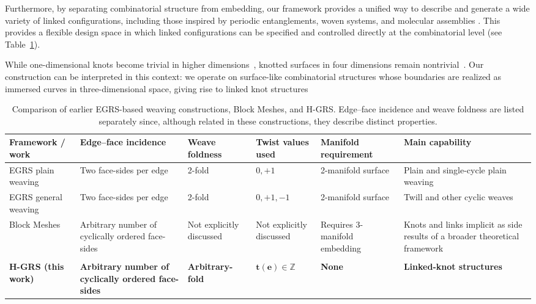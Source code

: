 \documentclass[acmtog]{acmart}
\begin{document}
Furthermore, by separating combinatorial structure from embedding, our framework provides a unified way to describe and generate a wide variety of linked configurations, including those inspired by periodic entanglements, woven systems, and molecular assemblies \citep{evans2013periodiceentanglement1,evans2013periodiceentanglement2,yildiz2025woven,yildiz2025linked}. 
This provides a flexible design space in which linked
configurations can be specified and controlled directly at the combinatorial
level (see Table~\ref{table1}).

While one-dimensional knots become trivial in higher dimensions~\cite{freedman1990topology}, knotted surfaces in four dimensions remain nontrivial~\cite{kamada2002surfaces}. Our construction can be interpreted in this context: we operate on surface-like combinatorial structures whose boundaries are realized as immersed curves in three-dimensional space, giving rise to linked knot structures

\begin{table}[t]
\centering

\caption{ Comparison of earlier EGRS-based weaving constructions, Block Meshes, and H-GRS. Edge--face incidence and weave foldness are listed separately since, although related in these constructions, they describe distinct properties.}
\label{tab:egrs-hgrs-comparison}
\small
\setlength{\tabcolsep}{4pt}
\begin{tabularx}{\textwidth}{@{}p{}p{}p{}p{}p{}X@{}}
\toprule
\textbf{Framework / work} &
\textbf{Edge--face incidence} &
\textbf{Weave foldness} &
\textbf{Twist values used} &
\textbf{Manifold requirement} &
\textbf{Main capability} \\
\midrule
EGRS plain weaving~\cite{akleman2009cyclic,xing2010single} &
Two face-sides per edge &
2-fold &
$0,+1$ &
2-manifold surface &
Plain and single-cycle plain weaving \\

EGRS general weaving~\cite{akleman2011cyclic,akleman2015extended,akleman2020topologically} &
Two face-sides per edge &
2-fold &
$0,+1,-1$ &
2-manifold surface &
Twill and other cyclic weaves \\

Block Meshes~\cite{akleman2015blockmeshes} &
Arbitrary number of cyclically ordered face-sides &
Not explicitly discussed &
Not explicitly discussed &
Requires 3-manifold embedding &
Knots and links implicit as side results of a broader theoretical framework \\\\

\textbf{H-GRS (this work)} &
\textbf{Arbitrary number of cyclically ordered face-sides} &
\textbf{Arbitrary-fold} &
$\boldsymbol{t(e)\in\mathbb{Z}}$ &
\textbf{None} &
\textbf{Linked-knot structures} \\
\bottomrule
\end{tabularx}
\label{table1}
\end{table}
\end{document}
